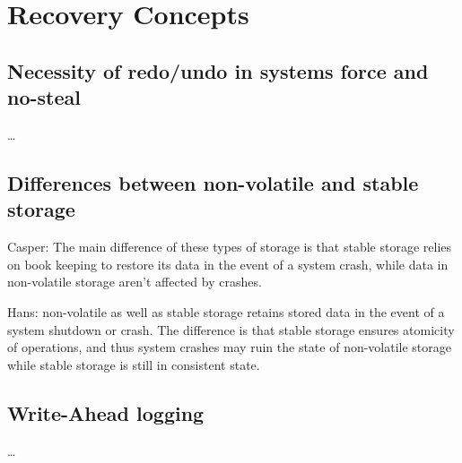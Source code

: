 
\section{Recovery Concepts}

\subsection{Necessity of redo/undo in systems force and no-steal}
\dots

\subsection{Differences between non-volatile and stable storage}
Casper: The main difference of these types of storage is that stable storage relies on
book keeping to restore its data in the event of a system crash, while data in
non-volatile storage aren't affected by crashes.

Hans: non-volatile as well as stable storage retains stored data in the event of a
system shutdown or crash. The difference is that stable storage ensures
atomicity of operations, and thus system crashes may ruin the state of
non-volatile storage while stable storage is still in consistent state.

\subsection{Write-Ahead logging}
\dots
